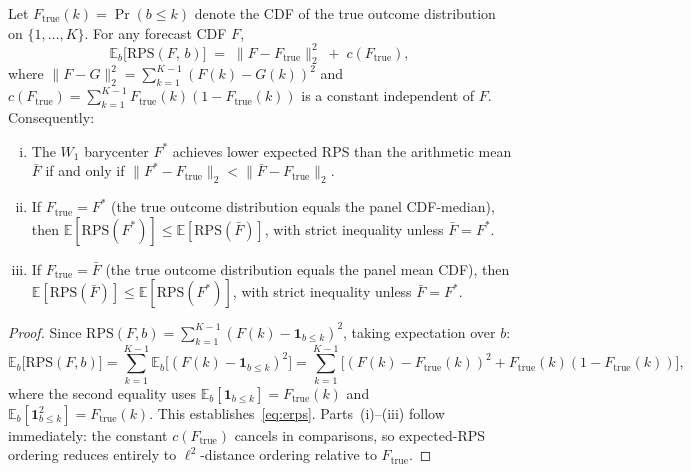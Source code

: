\begin{proposition}
\label{prop:rps_l2}
Let $F_{\mathrm{true}}(k) = \Pr(b \leq k)$ denote the CDF of the true outcome distribution on $\{1,\ldots,K\}$.  For any forecast CDF $F$,
\begin{equation}
\label{eq:erps}
  \mathbb{E}_b\bigl[\mathrm{RPS}(F,\, b)\bigr]
  \;=\; \|F - F_{\mathrm{true}}\|_2^2 \;+\; c(F_{\mathrm{true}}),
\end{equation}
where $\|F - G\|_2^2 = \sum_{k=1}^{K-1}(F(k)-G(k))^2$ and $c(F_{\mathrm{true}}) = \sum_{k=1}^{K-1}F_{\mathrm{true}}(k)(1-F_{\mathrm{true}}(k))$ is a constant independent of $F$.  Consequently:
\begin{enumerate}[(i)]
  \item The $W_1$ barycenter $F^*$ achieves lower expected RPS than the arithmetic mean $\bar{F}$ if and only if $\|F^* - F_{\mathrm{true}}\|_2 < \|\bar{F} - F_{\mathrm{true}}\|_2$.
  \item If $F_{\mathrm{true}} = F^*$ (the true outcome distribution equals the panel CDF-median), then $\mathbb{E}[\mathrm{RPS}(F^*)] \leq \mathbb{E}[\mathrm{RPS}(\bar{F})]$, with strict inequality unless $\bar{F} = F^*$.
  \item If $F_{\mathrm{true}} = \bar{F}$ (the true outcome distribution equals the panel mean CDF), then $\mathbb{E}[\mathrm{RPS}(\bar{F})] \leq \mathbb{E}[\mathrm{RPS}(F^*)]$, with strict inequality unless $\bar{F} = F^*$.
\end{enumerate}
\end{proposition}
\begin{proof}
Since $\mathrm{RPS}(F,b) = \sum_{k=1}^{K-1}(F(k) - \mathbf{1}_{b\leq k})^2$, taking expectation over $b$:
\[
  \mathbb{E}_b\bigl[\mathrm{RPS}(F,b)\bigr]
  = \sum_{k=1}^{K-1}\mathbb{E}_b\bigl[(F(k) - \mathbf{1}_{b\leq k})^2\bigr]
  = \sum_{k=1}^{K-1}\bigl[(F(k) - F_{\mathrm{true}}(k))^2 + F_{\mathrm{true}}(k)(1-F_{\mathrm{true}}(k))\bigr],
\]
where the second equality uses $\mathbb{E}_b[\mathbf{1}_{b\leq k}] = F_{\mathrm{true}}(k)$ and $\mathbb{E}_b[\mathbf{1}_{b\leq k}^2] = F_{\mathrm{true}}(k)$.  This establishes~\eqref{eq:erps}.  Parts~(i)--(iii) follow immediately: the constant $c(F_{\mathrm{true}})$ cancels in comparisons, so expected-RPS ordering reduces entirely to $\ell^2$-distance ordering relative to $F_{\mathrm{true}}$.
\end{proof}
